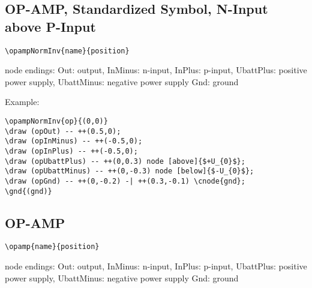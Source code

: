 \documentclass[parskip=full]{scrartcl}
\begin{document}
\subsection{OP-AMP, Standardized Symbol, N-Input above P-Input}

\begin{verbatim}
\opampNormInv{name}{position}
\end{verbatim}
node endings: Out: output, InMinus: n-input, InPlus: p-input,
              UbattPlus: positive power supply,
              UbattMinus: negative power supply
              Gnd: ground

Example:\\
\begin{minipage}{0.8\textwidth}
\begin{verbatim}
\opampNormInv{op}{(0,0)}
\draw (opOut) -- ++(0.5,0);
\draw (opInMinus) -- ++(-0.5,0);
\draw (opInPlus) -- ++(-0.5,0);
\draw (opUbattPlus) -- ++(0,0.3) node [above]{$+U_{0}$};
\draw (opUbattMinus) -- ++(0,-0.3) node [below]{$-U_{0}$};
\draw (opGnd) -- ++(0,-0.2) -| ++(0.3,-0.1) \cnode{gnd};
\gnd{(gnd)}
\end{verbatim}
\end{minipage}
\begin{minipage}{0.19\textwidth}
\end{minipage}

\subsection{OP-AMP}

\begin{verbatim}
\opamp{name}{position}
\end{verbatim}
node endings: Out: output, InMinus: n-input, InPlus: p-input,
              UbattPlus: positive power supply,
              UbattMinus: negative power supply
              Gnd: ground
\end{document}
